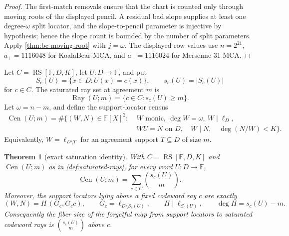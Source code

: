 \documentclass[11pt,a4paper]{amsart}
\numberwithin{equation}{section}
\newtheorem{theorem}{Theorem}[section]
\theoremstyle{remark}
\DeclareMathOperator{\RS}{RS}\DeclareMathOperator{\MCA}{MCA}\DeclareMathOperator{\CA}{CA}
\DeclareMathOperator{\Cen}{Cen}\DeclareMathOperator{\LineRay}{LineRay}\DeclareMathOperator{\dist}{dist}
\newcommand{\F}{\mathbb F}\newcommand{\B}{\mathbb B}\newcommand{\K}{\mathbb K}\newcommand{\Z}{\mathbb Z}
\begin{document}
\begin{proof}
The first-match removals ensure that the chart is counted only through moving roots of the displayed pencil.  A residual bad slope supplies at least one degree-\(\omega\) split locator, and the slope-to-pencil parameter is injective by hypothesis; hence the slope count is bounded by the number of split parameters.  Apply \cref{thm:bc-moving-root} with \(j=\omega\).  The displayed row values use \(n=2^{21}\), \(a_+=1116048\) for KoalaBear MCA, and \(a_+=1116024\) for Mersenne-31 MCA.
\end{proof}


\begin{definition}\label{def:saturated-rays}
Let \(C=\RS[\F,D,K]\), let \(U:D\to\F\), and put
\[
        S_c(U)=\{x\in D:U(x)=c(x)\},\qquad s_c(U)=|S_c(U)|
\]
for \(c\in C\).  The saturated ray set at agreement \(m\) is
\[
        \operatorname{Ray}(U;m)=\{c\in C:s_c(U)\ge m\}.
\]
Let \(\omega=n-m\), and define the support-locator census
\[
\begin{aligned}
\Cen(U;m)=\#\{(W,N)\in \F[X]^2:\;& W\text{ monic},\ \deg W=\omega,\ W\mid \ell_D,\\
        & WU=N\text{ on }D,\quad W\mid N,\quad \deg(N/W)<K\}.
\end{aligned}
\]
Equivalently, \(W=\ell_{D\setminus T}\) for an agreement support \(T\subseteq D\) of size \(m\).
\end{definition}

\begin{theorem}[exact saturation identity]\label{thm:saturation}
With \(C=\RS[\F,D,K]\) and \(\Cen(U;m)\) as in \cref{def:saturated-rays}, for every word \(U:D\to\F\),
\[
        \Cen(U;m)=\sum_{c\in C}\binom{s_c(U)}m .
\]
Moreover, the support locators lying above a fixed codeword ray \(c\) are exactly
\[
        (W,N)=H\,(G_c,G_cc),
        \qquad
        G_c=\ell_{D\setminus S_c(U)},
        \qquad
        H\mid\ell_{S_c(U)},
        \qquad
        \deg H=s_c(U)-m .
\]
Consequently the fiber size of the forgetful map from support locators to saturated codeword rays is \(\binom{s_c(U)}m\) above \(c\).
\end{theorem}
\end{document}
